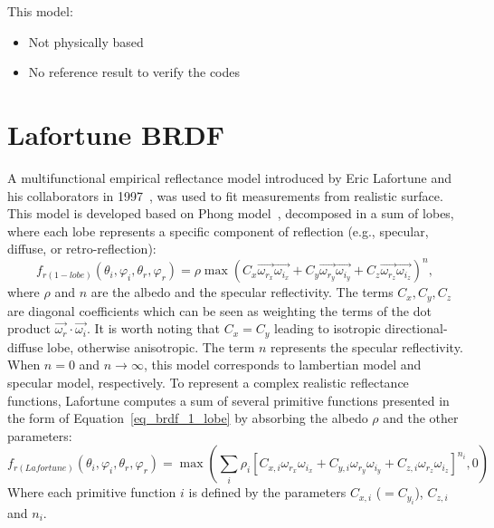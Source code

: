This model:
\begin{itemize}
    \item Not physically based
    \item No reference result to verify the codes
\end{itemize}



\section{Lafortune BRDF}

A multifunctional empirical reflectance model introduced by Eric Lafortune and his collaborators in 1997~\cite{1997_Lafortune,2015_Gimonet}, was used to fit measurements from realistic surface.
This model is developed based on Phong model~\cite{2015_Gimonet}, decomposed in a sum of lobes, where each lobe represents a specific component of reflection (e.g., specular, diffuse, or retro-reflection):
\begin{equation}
    \label{eq_brdf_1_lobe}
    f_{r(1-lobe)}(\theta_i, \varphi_i, \theta_r, \varphi_r) =
    \rho \max \left( C_x \overrightarrow{\omega_{r_x}} \overrightarrow{\omega_{i_x}} + C_y \overrightarrow{\omega_{r_y}} \overrightarrow{\omega_{i_y}} + C_z \overrightarrow{\omega_{r_z}} \overrightarrow{\omega_{i_z}}\right)^n,
\end{equation}
where $\rho$ and $n$ are the albedo and the specular reflectivity. The terms $C_x, C_y, C_z$ are diagonal coefficients which can  be seen as weighting the terms of the dot product $\overrightarrow{\omega_r} \cdot \overrightarrow{\omega_i}$.
It is worth noting that $C_x = C_y$ leading to isotropic directional-diffuse lobe, otherwise anisotropic.
The term $n$ represents the specular reflectivity.
When $n=0$ and $n \to \infty$, this model corresponds to lambertian model and specular model, respectively.
To represent a complex realistic reflectance functions, Lafortune computes a sum of several primitive functions presented in the form of Equation~\eqref{eq_brdf_1_lobe} by absorbing the albedo $\rho$ and the other parameters:
\begin{equation}
    \label{eq_brdf_Lafortune}
    f_{r(Lafortune)}(\theta_i, \varphi_i, \theta_r, \varphi_r) =
    \max \left( \sum_{i} \rho_i \left[
        C_{x, i} \omega_{r_x} \omega_{i_x} + C_{y, i} \omega_{r_y} \omega_{i_y} + C_{z, i} \omega_{r_z} \omega_{i_z}
        \right]^{n_i}, 0 \right)
\end{equation}
Where each primitive function $i$ is defined by the parameters $C_{x, i}$ ($=C_{y_i}$), $C_{z, i}$ and $n_i$.
